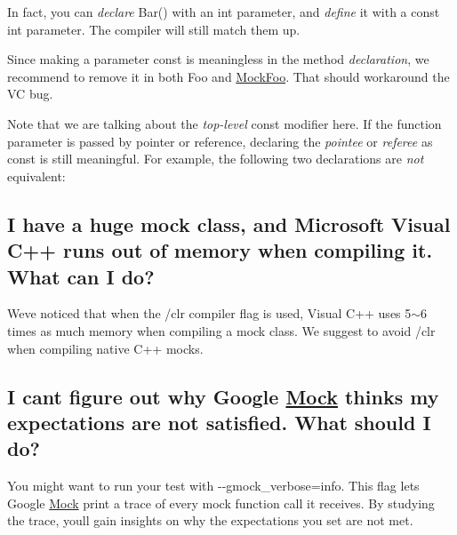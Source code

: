 In fact, you can {\itshape declare} Bar() with an {\ttfamily int} parameter, and {\itshape define} it with a {\ttfamily const int} parameter. The compiler will still match them up.

Since making a parameter {\ttfamily const} is meaningless in the method {\itshape declaration}, we recommend to remove it in both {\ttfamily Foo} and {\ttfamily \mbox{\hyperlink{class_mock_foo}{Mock\+Foo}}}. That should workaround the VC bug.

Note that we are talking about the {\itshape top-\/level} {\ttfamily const} modifier here. If the function parameter is passed by pointer or reference, declaring the {\itshape pointee} or {\itshape referee} as {\ttfamily const} is still meaningful. For example, the following two declarations are {\itshape not} equivalent\+: 
\begin{DoxyCode}{0}
\end{DoxyCode}


\subsection*{I have a huge mock class, and Microsoft Visual C++ runs out of memory when compiling it. What can I do?}

We\textquotesingle{}ve noticed that when the {\ttfamily /clr} compiler flag is used, Visual C++ uses 5$\sim$6 times as much memory when compiling a mock class. We suggest to avoid {\ttfamily /clr} when compiling native C++ mocks.

\subsection*{I can\textquotesingle{}t figure out why Google \mbox{\hyperlink{class_mock}{Mock}} thinks my expectations are not satisfied. What should I do?}

You might want to run your test with {\ttfamily -\/-\/gmock\+\_\+verbose=info}. This flag lets Google \mbox{\hyperlink{class_mock}{Mock}} print a trace of every mock function call it receives. By studying the trace, you\textquotesingle{}ll gain insights on why the expectations you set are not met.


